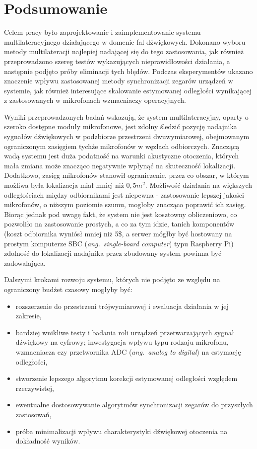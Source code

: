 \chapter*{Podsumowanie}\label{chap:podsumowanie}

Celem pracy było zaprojektowanie i zaimplementowanie systemu multilateracyjnego działającego w domenie fal dźwiękowych. Dokonano wyboru metody multilateracji najlepiej nadającej się do tego zastosowania, jak również przeprowadzono szereg testów wykazujących nieprawidłowości działania, a następnie podjęto próby eliminacji tych błędów. Podczas eksperymentów ukazano znaczenie wpływu zastosowanej metody synchronizacji zegarów urządzeń w systemie, jak również interesujące skalowanie estymowanej odległości wynikającej z zastosowanych w mikrofonach wzmacniaczy operacyjnych.

Wyniki przeprowadzonych badań wskazują, że system multilateracyjny, oparty o szeroko dostępne moduły mikrofonowe, jest zdolny śledzić pozycję nadajnika sygnałów dźwiękowych w podzbiorze przestrzeni dwuwymiarowej, obejmowanym ograniczonym zasięgiem tychże mikrofonów w węzłach odbiorczych. Znaczącą wadą systemu jest duża podatność na warunki akustyczne otoczenia, których mała zmiana może znacząco negatywnie wpłynąć na skuteczność lokalizacji. Dodatkowo, zasięg mikrofonów stanowił ograniczenie, przez co obszar, w którym możliwa była lokalizacja miał mniej niż $0,5 m^2$. Możliwość działania na większych odległościach między odbiornikami jest niepewna {-} zastosowanie lepszej jakości mikrofonów, o niższym poziomie szumu, mogłoby znacząco poprawić ich zasięg. Biorąc jednak pod uwagę fakt, że system nie jest kosztowny obliczeniowo, co pozwoliło na zastosowanie prostych, a co za tym idzie, tanich komponentów (koszt odbiornika wyniósł mniej niż 5\$, a serwer mógłby być hostowany na prostym komputerze SBC (\textit{ang.\ single-board computer}) typu Raspberry Pi) zdolność do lokalizacji nadajnika przez zbudowany system powinna być zadowalająca.

Dalszymi krokami rozwoju systemu, których nie podjęto ze względu na ograniczony budżet czasowy mogłyby być:

\begin{itemize}
    \item rozszerzenie do przestrzeni trójwymiarowej i ewaluacja działania w jej zakresie,
    \item bardziej wnikliwe testy i badania roli urządzeń przetwarzających sygnał dźwiękowy na cyfrowy; inwestygacja wpływu typu rodzaju mikrofonu, wzmacniacza czy przetwornika ADC (\textit{ang.\ analog to digital}) na estymację odległości,
    \item stworzenie lepszego algorytmu korekcji estymowanej odległości względem rzeczywistej,
    \item ewentualne dostosowywanie algorytmów synchronizacji zegarów do przyszłych zastosowań,
    \item próba minimalizacji wpływu charakterystyki dźwiękowej otoczenia na dokładność wyników.
\end{itemize}

